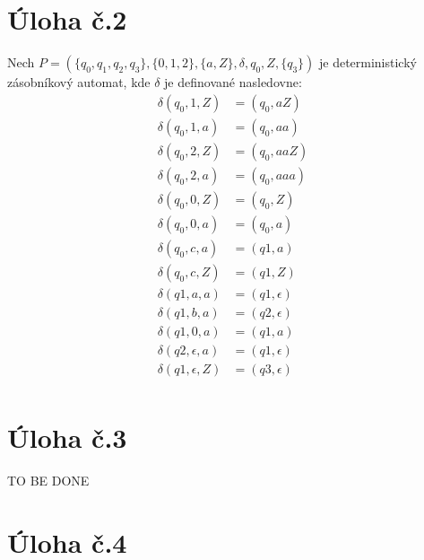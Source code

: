 \documentclass[10pt]{article}
\begin{document}
\section*{Úloha č.2}
    Nech $P = (\{q_0, q_1, q_2, q_3\}, \{0,1,2\}, \{a,Z\}, \delta, q_0, Z, \{q_3\})$ je deterministický zásobníkový automat, kde
    $\delta$ je definované nasledovne:
    \begin{align*}
        \delta (q_0, 1, Z) &= (q_0, aZ)\\
        \delta (q_0, 1, a) &= (q_0, aa)\\
        \delta (q_0, 2, Z) &= (q_0, aaZ)\\
        \delta (q_0, 2, a) &= (q_0, aaa)\\
        \delta (q_0, 0, Z) &= (q_0, Z)\\
        \delta (q_0, 0, a) &= (q_0, a)\\
        \delta (q_0, c, a) &= (q1, a)\\
        \delta (q_0, c, Z) &= (q1, Z)\\
        \delta (q1, a, a) &= (q1, \epsilon)\\
        \delta (q1, b, a) &= (q2, \epsilon)\\
        \delta (q1, 0, a) &= (q1, a)\\
        \delta (q2, \epsilon, a) &= (q1, \epsilon)\\
        \delta (q1, \epsilon, Z) &= (q3, \epsilon)\\
    \end{align*}


\section*{Úloha č.3}
TO BE DONE

\section*{Úloha č.4}
\end{document}
